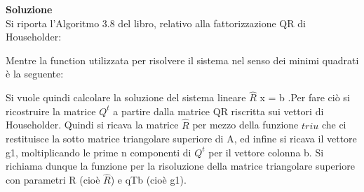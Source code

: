 \large\noindent{}
\begin{flushleft}
	\large \textbf{Soluzione}\\[0.5cm]
	Si riporta l'Algoritmo 3.8 del libro, relativo alla fattorizzazione QR di Householder:
	
	Mentre la function utilizzata per risolvere il sistema nel senso dei minimi quadrati è la seguente:
	
	Si vuole quindi calcolare la soluzione del sistema lineare $\hat{R}$ x = b .Per fare ciò si ricostruire la matrice $Q^{t}$ a partire dalla matrice QR riscritta sui vettori di Householder. Quindi si ricava la matrice $\hat{R}$ per mezzo della funzione $triu$ che ci restituisce la sotto matrice triangolare superiore di A, ed infine si ricava il vettore g1, moltiplicando le prime n componenti di $Q^{t}$ per il vettore colonna b. Si richiama dunque la funzione per la risoluzione della matrice triangolare superiore con parametri R (cioè $\hat{R}$) e qTb (cioè g1).
\end{flushleft}